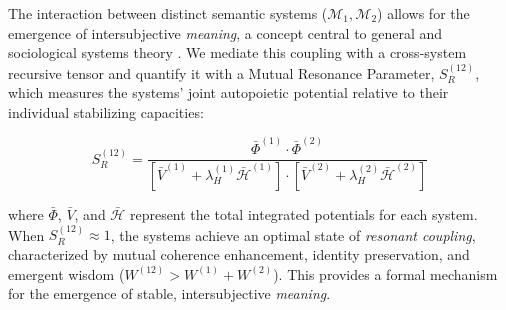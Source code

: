 The interaction between distinct semantic systems (\(\mathcal{M}_1, \mathcal{M}_2\)) allows for the emergence of intersubjective \textit{meaning}, a concept central to general and sociological systems theory \autocite{vonBertalanffy1968, Luhmann1995}. We mediate this coupling with a cross-system recursive tensor and quantify it with a Mutual Resonance Parameter, \(S_R^{(12)}\), which measures the systems' joint autopoietic potential relative to their individual stabilizing capacities:

\begin{equation}
S_R^{(12)} = \frac{\bar{\Phi}^{(1)} \cdot \bar{\Phi}^{(2)}}{[\bar{V}^{(1)} + \lambda_H^{(1)} \bar{\mathcal{H}}^{(1)}] \cdot [\bar{V}^{(2)} + \lambda_H^{(2)} \bar{\mathcal{H}}^{(2)}]}
\end{equation}

where \(\bar{\Phi}\), \(\bar{V}\), and \(\bar{\mathcal{H}}\) represent the total integrated potentials for each system. When \(S_R^{(12)} \approx 1\), the systems achieve an optimal state of \textit{resonant coupling}, characterized by mutual coherence enhancement, identity preservation, and emergent wisdom (\(W^{(12)} > W^{(1)} + W^{(2)}\)). This provides a formal mechanism for the emergence of stable, intersubjective \textit{meaning}.